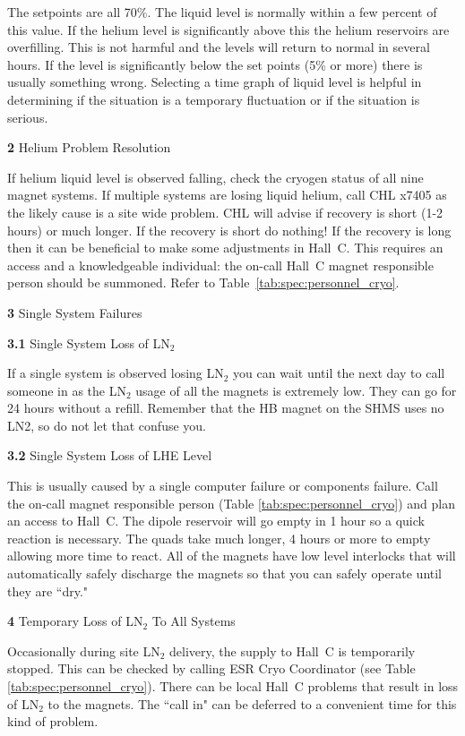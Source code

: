 \begin{description}
\item{}\hskip0.3in The setpoints are all 70\%.  The liquid
  level is normally within a few percent of this value.  If
  the helium level is significantly above this
  the helium reservoirs are overfilling.  This is not harmful and the
  levels will return to normal in several hours.  If the level is
  significantly below the set points (5\% or more) there is usually
  something wrong.  Selecting a time graph of liquid level is helpful in
  determining if the situation is a temporary fluctuation or if the
  situation is serious.
\item{\bf 2}\hskip0.1in Helium Problem Resolution
\item{}\hskip0.3in If helium liquid level is observed falling, check the cryogen status of all nine magnet
  systems.  If multiple systems are losing liquid helium,  call CHL x7405 as the
  likely cause is a site wide problem.  CHL will advise if recovery is
  short (1-2 hours) or much longer.  If the recovery is short do nothing!
  If the recovery is long then it can be beneficial to make some
  adjustments in Hall~C.  This requires an access and a knowledgeable
  individual: the on-call Hall~C magnet responsible person
  should be summoned. Refer to Table~\ref{tab:spec:personnel_cryo}.
\item{\bf 3}\hskip0.1in Single System Failures
\item{\bf 3.1}\hskip0.1in Single System Loss of LN$_2$
\item{}\hskip0.3in If a single system is observed losing LN$_2$ you can
  wait until
  the next day to call someone in as the LN$_2$ usage of all the magnets
  is extremely low.  They can go for 24 hours without a refill. Remember that the
  HB magnet on the SHMS uses no LN2, so do not let that confuse you.
\item{\bf 3.2}\hskip0.1in Single System Loss of LHE Level
\item{}\hskip0.3in This is usually caused by a single computer failure or
  components failure.  Call the on-call magnet responsible person (Table \ref{tab:spec:personnel_cryo})
  and plan an access to Hall~C. The dipole reservoir will go empty in 1 hour so a quick reaction is
  necessary.  The quads take much longer, 4 hours or more to empty
  allowing more time to react.  All of the magnets have low level
  interlocks that will automatically safely discharge the magnets
  so that you can safely operate until they are ``dry."
\item{\bf 4}\hskip0.1in Temporary Loss of LN$_2$ To All Systems
\item{}\hskip0.3in Occasionally during site LN$_2$ delivery, the supply to
  Hall~C
  is temporarily stopped.  This can be checked by calling ESR Cryo Coordinator
  (see Table \ref{tab:spec:personnel_cryo}).  There
  can be local Hall~C problems that result in loss of LN$_2$ to the
  magnets. The ``call in" can be deferred to a convenient time for this
  kind of problem.
\end{description}

